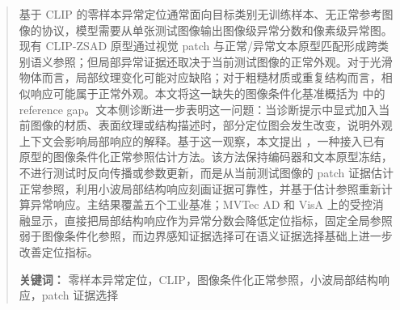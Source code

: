 \begin{abstract}
基于 CLIP 的零样本异常定位通常面向目标类别无训练样本、无正常参考图像的协议，模型需要从单张测试图像输出图像级异常分数和像素级异常图。现有 CLIP-ZSAD 原型通过视觉 patch 与正常/异常文本原型匹配形成跨类别语义参照；但局部异常证据还取决于当前测试图像的正常外观。对于光滑物体而言，局部纹理变化可能对应缺陷；对于粗糙材质或重复结构而言，相似响应可能属于正常外观。本文将这一缺失的图像条件化基准概括为 \clipzsad{} 中的 reference gap。文本侧诊断进一步表明这一问题：当诊断提示中显式加入当前图像的材质、表面纹理或结构描述时，部分定位图会发生改变，说明外观上下文会影响局部响应的解释。基于这一观察，本文提出 \method{}，一种接入已有 \clipzsad{} 原型的图像条件化正常参照估计方法。该方法保持编码器和文本原型冻结，不进行测试时反向传播或参数更新，而是从当前测试图像的 patch 证据估计正常参照，利用小波局部结构响应刻画证据可靠性，并基于估计参照重新计算异常响应。主结果覆盖五个工业基准；MVTec AD 和 VisA 上的受控消融显示，直接把局部结构响应作为异常分数会降低定位指标，固定全局参照弱于图像条件化参照，而边界感知证据选择可在语义证据选择基础上进一步改善定位指标。

\noindent\textbf{关键词：} 零样本异常定位，CLIP，图像条件化正常参照，小波局部结构响应，patch 证据选择
\end{abstract}
